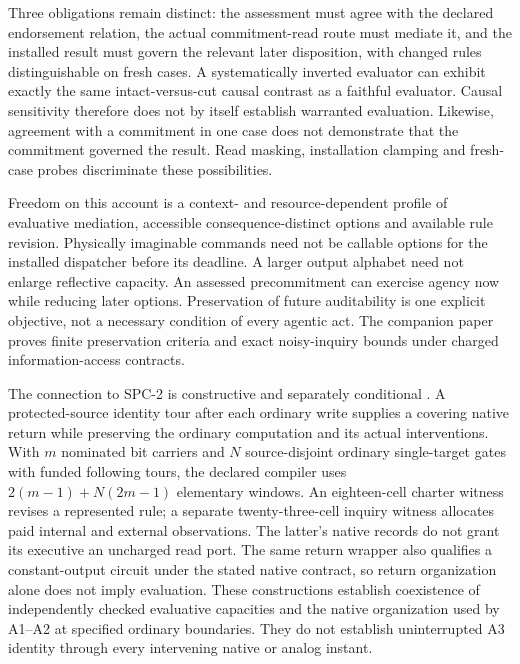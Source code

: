 Three obligations remain distinct: the assessment must agree with the declared endorsement relation, the actual commitment-read route must mediate it, and the installed result must govern the relevant later disposition, with changed rules distinguishable on fresh cases. A systematically inverted evaluator can exhibit exactly the same intact-versus-cut causal contrast as a faithful evaluator. Causal sensitivity therefore does not by itself establish warranted evaluation. Likewise, agreement with a commitment in one case does not demonstrate that the commitment governed the result. Read masking, installation clamping and fresh-case probes discriminate these possibilities.

Freedom on this account is a context- and resource-dependent profile of evaluative mediation, accessible consequence-distinct options and available rule revision. Physically imaginable commands need not be callable options for the installed dispatcher before its deadline. A larger output alphabet need not enlarge reflective capacity. An assessed precommitment can exercise agency now while reducing later options. Preservation of future auditability is one explicit objective, not a necessary condition of every agentic act. The companion paper proves finite preservation criteria and exact noisy-inquiry bounds under charged information-access contracts.

The connection to SPC-2 is constructive and separately conditional \cite[Section~7]{RodgersReflectiveFreedom}. A protected-source identity tour after each ordinary write supplies a covering native return while preserving the ordinary computation and its actual interventions. With $m$ nominated bit carriers and $N$ source-disjoint ordinary single-target gates with funded following tours, the declared compiler uses $2(m-1)+N(2m-1)$ elementary windows. An eighteen-cell charter witness revises a represented rule; a separate twenty-three-cell inquiry witness allocates paid internal and external observations. The latter's native records do not grant its executive an uncharged read port. The same return wrapper also qualifies a constant-output circuit under the stated native contract, so return organization alone does not imply evaluation. These constructions establish coexistence of independently checked evaluative capacities and the native organization used by A1--A2 at specified ordinary boundaries. They do not establish uninterrupted A3 identity through every intervening native or analog instant.

